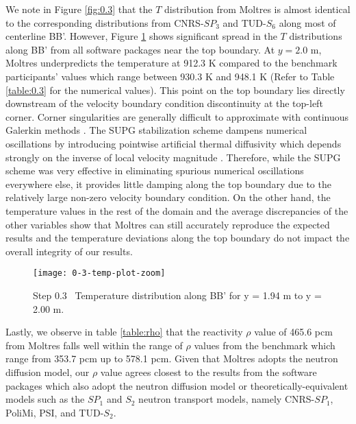 We
note in Figure \ref{fig:0.3} that the $T$ distribution from Moltres is almost
identical to the corresponding distributions from CNRS-$SP_3$ and TUD-$S_6$
along most of centerline BB'. However, Figure \ref{fig:0.3-zoom} shows
significant spread in the $T$ distributions along BB' from all software
packages near the top boundary. At $y = 2.0$ m, Moltres underpredicts the
temperature at 912.3 K compared to the benchmark participants' values which
range between 930.3 K and 948.1 K (Refer to Table \ref{table:0.3} for the
numerical values). This point on the top boundary lies directly downstream of
the velocity boundary condition discontinuity at the top-left corner.
Corner singularities are generally difficult to approximate with
continuous Galerkin methods \cite{kuhlmann_lid-driven_2018}.
The \gls{SUPG} stabilization scheme dampens numerical oscillations by
introducing pointwise artificial thermal diffusivity which depends strongly on
the inverse of local velocity magnitude \cite{peterson_overview_2018}.
Therefore, while the \gls{SUPG} scheme was very effective in eliminating
spurious numerical oscillations everywhere else, it provides little damping
along the top boundary due to the relatively large non-zero velocity boundary
condition. On the other hand, the temperature values in the rest of the domain
and the average discrepancies of the other variables show that Moltres can
still accurately reproduce the expected results and the temperature deviations
along the top boundary do not impact the overall integrity of our results.

\begin{figure}[htb]
	\centering
	\texttt{[image: 0-3-temp-plot-zoom]}
	\caption{Step 0.3 \textemdash\ Temperature distribution along BB' for y = 1.94 m to
	y = 2.00 m.}
	\label{fig:0.3-zoom}
\end{figure}

Lastly, we observe in table \ref{table:rho} that the reactivity $\rho$ value of
465.6 pcm from Moltres falls well within the range of $\rho$ values from the
benchmark which range from 353.7 pcm up to 578.1 pcm. Given that Moltres 
adopts the neutron diffusion model, our $\rho$ value agrees closest to the
results from the software packages which also adopt the neutron diffusion model
or theoretically-equivalent models such as the $SP_1$ and $S_2$ neutron
transport models, namely CNRS-$SP_1$, PoliMi, PSI, and TUD-$S_2$.

